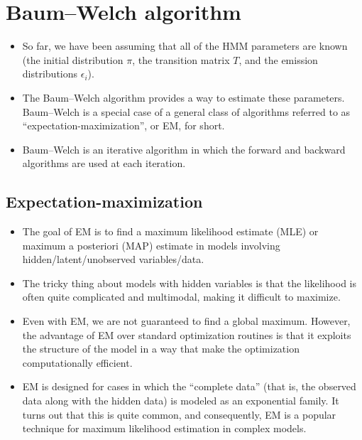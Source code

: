 \documentclass[12pt]{article}
\begin{document}
\section[Baum--Welch algorithm (for HMM parameter estimation)]{Baum--Welch algorithm}

\begin{itemize}
\item So far, we have been assuming that all of the HMM parameters are known (the initial distribution $\pi$, the transition matrix $T$, and the emission distributions $\epsilon_i$).
\item The Baum--Welch algorithm provides a way to estimate these parameters. Baum--Welch is a special case of a general class of algorithms referred to as ``expectation-maximization'', or EM, for short.
\item Baum--Welch is an iterative algorithm in which the forward and backward algorithms are used at each iteration.
\end{itemize}

\subsection{Expectation-maximization}

\begin{itemize}
\item  The goal of EM is to find a maximum likelihood estimate (MLE) or maximum a posteriori (MAP) estimate in models involving hidden/latent/unobserved variables/data.
\item The tricky thing about models with hidden variables is that the likelihood is often quite complicated and multimodal, making it difficult to maximize.
\item Even with EM, we are not guaranteed to find a global maximum. However, the advantage of EM over standard optimization routines is that it exploits the structure of the model in a way that make the optimization computationally efficient.
\item EM is designed for cases in which the ``complete data'' (that is, the observed data along with the hidden data) is modeled as an exponential family. It turns out that this is quite common, and consequently, EM is a popular technique for maximum likelihood estimation in complex models.
\end{itemize}
\end{document}
